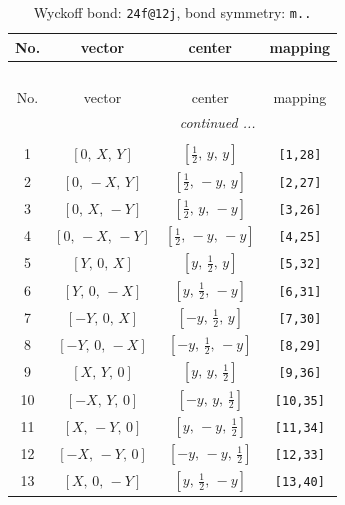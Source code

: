 \documentclass[fleqn,8pt]{jsarticle}
\begin{document}
\begin{longtable}{cccc}
\caption{Wyckoff bond: {\tt 24f@12j}, bond symmetry: {\tt m..}}
 \\
 \hline \hline
No. & vector & center & mapping \\ \hline \endfirsthead

\multicolumn{3}{l}{\tablename\ \thetable{}} \\
 \hline \hline
No. & vector & center & mapping \\ \hline \endhead

 \hline \hline
\multicolumn{3}{r}{\footnotesize\it continued ...} \\ \endfoot

 \hline \hline
\multicolumn{3}{r}{} \\ \endlastfoot

1 & $\left[ 0,\, X,\, Y \right]$ & $\left[ \frac{1}{2},\, y,\, y \right]$ & {\tt [1,28]} \\ \hline
2 & $\left[ 0,\, - X,\, Y \right]$ & $\left[ \frac{1}{2},\, - y,\, y \right]$ & {\tt [2,27]} \\ \hline
3 & $\left[ 0,\, X,\, - Y \right]$ & $\left[ \frac{1}{2},\, y,\, - y \right]$ & {\tt [3,26]} \\ \hline
4 & $\left[ 0,\, - X,\, - Y \right]$ & $\left[ \frac{1}{2},\, - y,\, - y \right]$ & {\tt [4,25]} \\ \hline
5 & $\left[ Y,\, 0,\, X \right]$ & $\left[ y,\, \frac{1}{2},\, y \right]$ & {\tt [5,32]} \\ \hline
6 & $\left[ Y,\, 0,\, - X \right]$ & $\left[ y,\, \frac{1}{2},\, - y \right]$ & {\tt [6,31]} \\ \hline
7 & $\left[ - Y,\, 0,\, X \right]$ & $\left[ - y,\, \frac{1}{2},\, y \right]$ & {\tt [7,30]} \\ \hline
8 & $\left[ - Y,\, 0,\, - X \right]$ & $\left[ - y,\, \frac{1}{2},\, - y \right]$ & {\tt [8,29]} \\ \hline
9 & $\left[ X,\, Y,\, 0 \right]$ & $\left[ y,\, y,\, \frac{1}{2} \right]$ & {\tt [9,36]} \\ \hline
10 & $\left[ - X,\, Y,\, 0 \right]$ & $\left[ - y,\, y,\, \frac{1}{2} \right]$ & {\tt [10,35]} \\ \hline
11 & $\left[ X,\, - Y,\, 0 \right]$ & $\left[ y,\, - y,\, \frac{1}{2} \right]$ & {\tt [11,34]} \\ \hline
12 & $\left[ - X,\, - Y,\, 0 \right]$ & $\left[ - y,\, - y,\, \frac{1}{2} \right]$ & {\tt [12,33]} \\ \hline
13 & $\left[ X,\, 0,\, - Y \right]$ & $\left[ y,\, \frac{1}{2},\, - y \right]$ & {\tt [13,40]} \\ \hline

\end{longtable}
\end{document}
